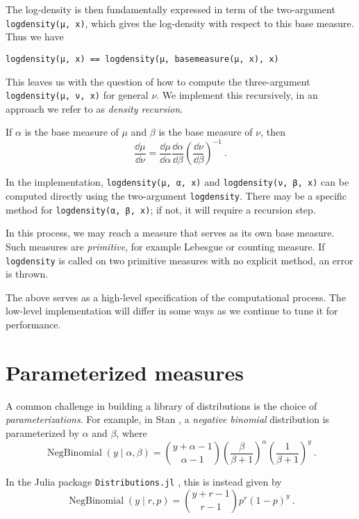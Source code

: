 \documentclass{juliacon}
\begin{document}
The log-density is then fundamentally expressed in term of the two-argument \verb|logdensity(μ, x)|, which gives the log-density with respect to this base measure. Thus we have
\begin{verbatim}
logdensity(μ, x) == logdensity(μ, basemeasure(μ, x), x)
\end{verbatim}

This leaves us with the question of how to compute the three-argument \verb|logdensity(μ, ν, x)| for general $\nu$. We implement this recursively, in an approach we refer to as \emph{density recursion}.



If $\alpha$ is the base measure of $\mu$ and $\beta$ is the base measure of $\nu$, then
\[
\frac{\dd \mu}{\dd \nu} =
\frac{\dd \mu}{\dd \alpha}
\frac{\dd \alpha}{\dd \beta}
\left(\frac{\dd \nu}{\dd \beta}\right)^{-1}\ .
\]

In the implementation, \verb|logdensity(μ, α, x)| and \verb|logdensity(ν, β, x)| can be computed directly using the two-argument \verb|logdensity|. There may be a specific method for \verb|logdensity(α, β, x)|; if not, it will require a recursion step.

In this process, we may reach a measure that serves as its own base measure. Such measures are \emph{primitive}, for example Lebesgue or counting measure. If \verb|logdensity| is called on two primitive measures with no explicit method, an error is thrown.

The above serves as a high-level specification  of the computational process. The low-level implementation will differ in some ways as we continue to tune it for performance.


\section{Parameterized measures}

A common challenge in building a library of distributions is the choice of \emph{parameterizations}. For example, in Stan \cite{Stan},
a \emph{negative binomial} distribution is parameterized by $\alpha$ and $\beta$, where
\[
\operatorname{NegBinomial}(y \mid \alpha, \beta)
=\binom{y+\alpha-1}{\alpha-1}\left(\frac{\beta}{\beta+1}\right)^{\alpha}\left(\frac{1}{\beta+1}\right)^{y}\ .
\]

In the Julia package \verb|Distributions.jl| \cite{Distributions.jl-2019}, this is instead given by
\[
\operatorname{NegBinomial}(y \mid r, p)
= \binom{y + r - 1}{r - 1} p^r (1 - p)^y \ .
\]
\end{document}
